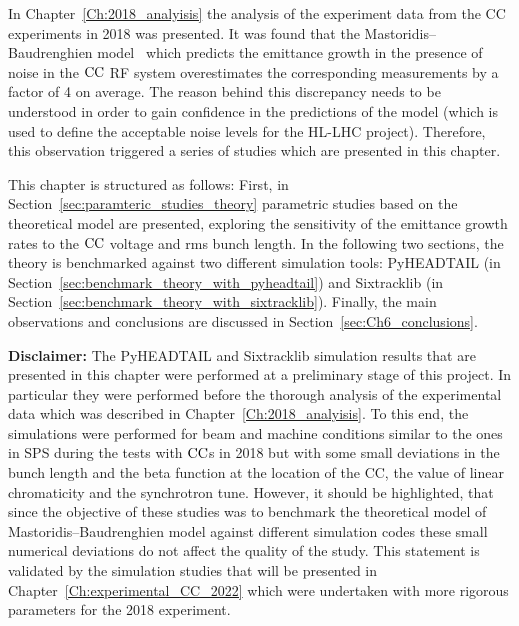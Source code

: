 In Chapter~\ref{Ch:2018_analyisis} the analysis of the experiment data from the CC experiments in 2018 was presented. It was found that the Mastoridis--Baudrenghien model~\cite{PhysRevSTAB.18.101001} which predicts the emittance growth in the presence of noise in the ${\mathrm{CC}}$ RF system overestimates the corresponding measurements by a factor of 4 on average. The reason behind this discrepancy needs to be understood in order to gain confidence in the predictions of the model (which is used to define the acceptable noise levels for the HL-LHC project). Therefore, this observation triggered a series of studies which are presented in this chapter.

This chapter is structured as follows: First, in Section~\ref{sec:paramteric_studies_theory} parametric studies based on the theoretical model are presented, exploring the sensitivity of the emittance growth rates to the ${\mathrm{CC}}$ voltage and rms bunch length. In the following two sections, the theory is benchmarked against two different simulation tools: PyHEADTAIL (in Section~\ref{sec:benchmark_theory_with_pyheadtail}) and Sixtracklib (in Section~\ref{sec:benchmark_theory_with_sixtracklib}). Finally, the main observations and conclusions are discussed in Section~\ref{sec:Ch6_conclusions}.


\textbf{Disclaimer:} The PyHEADTAIL and Sixtracklib simulation results that are presented in this chapter were performed at a preliminary stage of this project. In  particular they were performed before the thorough analysis of the experimental data which was described in Chapter~\ref{Ch:2018_analyisis}. To this end, the simulations were performed for beam and machine conditions similar to the ones in SPS during the tests with ${\mathrm{CC}}$s in 2018 but with some small deviations in the bunch length and the beta function at the location of the CC, the value of linear chromaticity and the synchrotron tune. However, it should be highlighted, that since the objective of these studies was to benchmark the theoretical model of Mastoridis--Baudrenghien model against different simulation codes these small numerical deviations do not affect the quality of the study. This statement is validated by the simulation studies that will be presented in Chapter~\ref{Ch:experimental_CC_2022} which were undertaken with more rigorous parameters for the 2018 experiment.


